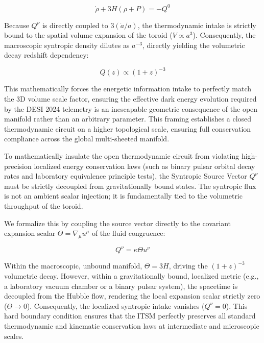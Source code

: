 \documentclass[aps,prd,10pt,twocolumn,superscriptaddress,nofootinbib,floatfix]{revtex4-2}
\begin{document}
\begin{equation}
\dot{\rho} + 3H(\rho + P) = -Q^0
\end{equation}

Because $Q^\nu$ is directly coupled to $3(\dot{a}/a)$, the thermodynamic intake is strictly bound to the spatial volume expansion of the toroid ($V \propto a^3$). Consequently, the macroscopic syntropic density dilutes as $a^{-3}$, directly yielding the volumetric decay redshift dependency:

\begin{equation} \label{eq:syntropic_decay}
Q(z) \propto (1+z)^{-3}
\end{equation}

This mathematically forces the energetic information intake to perfectly match the 3D volume scale factor, ensuring the effective dark energy evolution required by the DESI 2024 telemetry is an inescapable geometric consequence of the open manifold rather than an arbitrary parameter. This framing establishes a closed thermodynamic circuit on a higher topological scale, ensuring full conservation compliance across the global multi-sheeted manifold.

To mathematically insulate the open thermodynamic circuit from violating high-precision localized energy conservation laws (such as binary pulsar orbital decay rates and laboratory equivalence principle tests), the Syntropic Source Vector $Q^\nu$ must be strictly decoupled from gravitationally bound states. The syntropic flux is not an ambient scalar injection; it is fundamentally tied to the volumetric throughput of the toroid. 

We formalize this by coupling the source vector directly to the covariant expansion scalar $\Theta = \nabla_\mu u^\mu$ of the fluid congruence:

\begin{equation}
Q^\nu = \kappa \Theta u^\nu
\end{equation}

Within the macroscopic, unbound manifold, $\Theta = 3H$, driving the $(1+z)^{-3}$ volumetric decay. However, within a gravitationally bound, localized metric (e.g., a laboratory vacuum chamber or a binary pulsar system), the spacetime is decoupled from the Hubble flow, rendering the local expansion scalar strictly zero ($\Theta \to 0$). Consequently, the localized syntropic intake vanishes ($Q^\nu = 0$). This hard boundary condition ensures that the ITSM perfectly preserves all standard thermodynamic and kinematic conservation laws at intermediate and microscopic scales.
\end{document}
